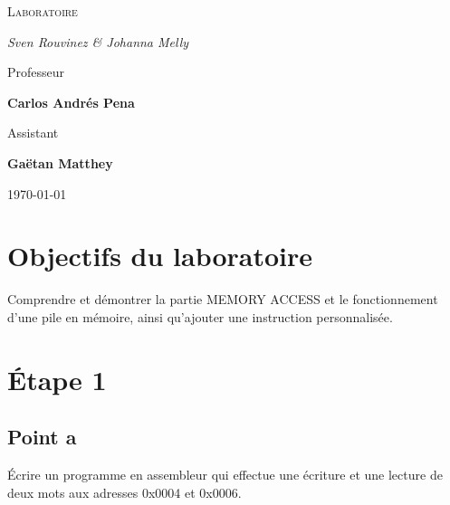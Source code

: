 \documentclass[a4paper]{article} %
\begin{document}

 

\begin{titlepage}
	\centering
	
	{\scshape\LARGE \color{Monokaimagenta} Laboratoire \\  \par}
	
	\vspace{1cm}
	
	{\Large\itshape Sven Rouvinez \& Johanna Melly\par}
	
	\vfill
	Professeur\par
	\textbf{Carlos Andrés Pena} \par%
	\vspace{1cm}
	Assistant\par
	\textbf{Gaëtan Matthey}
	
	\vfill

	{\large \today\par}
	
\end{titlepage}

\section{Objectifs du laboratoire}
Comprendre et démontrer la partie MEMORY ACCESS et le fonctionnement d'une pile en mémoire, ainsi qu'ajouter une instruction personnalisée.
\section{Étape 1}
\subsection{Point a}
Écrire un programme en assembleur qui effectue une écriture et une lecture de deux mots aux adresses 0x0004 et 0x0006.
\end{document}
